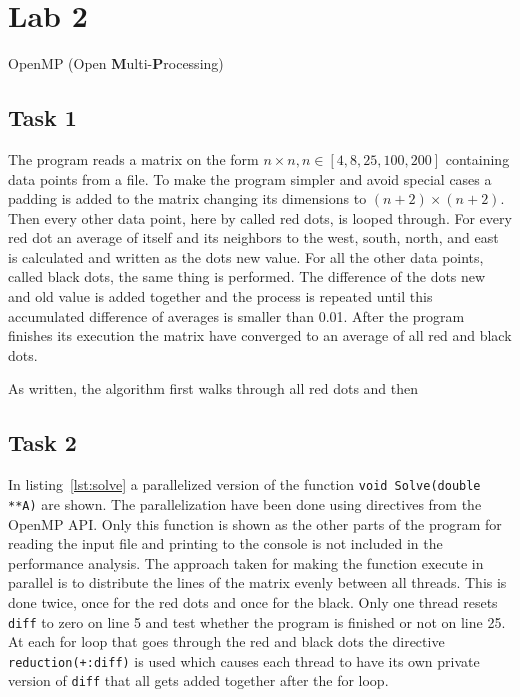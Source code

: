 \section{Lab 2}
\label{sec:lab2}
OpenMP (Open \textbf Multi-\textbf Processing)

\subsection{Task 1}

The program reads a matrix on the form $n \times n, n \in [4,8,25,100,200]$ containing data points from a file. To make the program simpler and avoid special cases a padding is added to the matrix changing its dimensions to $(n+2) \times (n+2)$. Then every other data point, here by called red dots, is looped through. For every red dot an average of itself and its neighbors to the west, south, north, and east is calculated and written as the dots new value. For all the other data points, called black dots, the same thing is performed. The difference of the dots new and old value is added together and the process is repeated until this accumulated difference of averages is smaller than 0.01. After the program finishes its execution the matrix have converged to an average of all red and black dots.

As written, the algorithm first walks through all red dots and then  

\subsection{Task 2}
In listing~\ref{lst:solve} a parallelized version of the function \texttt{void Solve(double **A)} are shown. The parallelization have been done using directives from the OpenMP API. Only this function is shown as the other parts of the program for reading the input file and printing to the console is not included in the performance analysis. The approach taken for making the function execute in parallel is to distribute the lines of the matrix evenly between all threads. This is done twice, once for the red dots and once for the black. Only one thread resets \texttt{diff} to zero on line 5 and test whether the program is finished or not on line 25. At each for loop that goes through the red and black dots the directive \texttt{reduction(+:diff)} is used which causes each thread to have its own private version of \texttt{diff} that all gets added together after the for loop.

